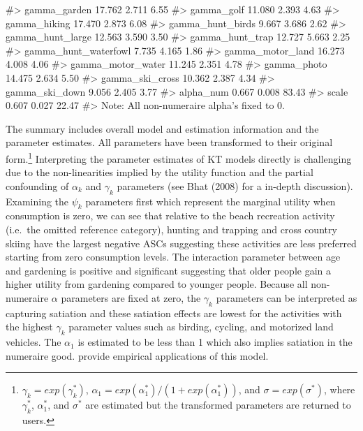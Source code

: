 \begin{Schunk}
\begin{Soutput}
#> gamma_garden           17.762   2.711   6.55
#> gamma_golf             11.080   2.393   4.63
#> gamma_hiking           17.470   2.873   6.08
#> gamma_hunt_birds        9.667   3.686   2.62
#> gamma_hunt_large       12.563   3.590   3.50
#> gamma_hunt_trap        12.727   5.663   2.25
#> gamma_hunt_waterfowl    7.735   4.165   1.86
#> gamma_motor_land       16.273   4.008   4.06
#> gamma_motor_water      11.245   2.351   4.78
#> gamma_photo            14.475   2.634   5.50
#> gamma_ski_cross        10.362   2.387   4.34
#> gamma_ski_down          9.056   2.405   3.77
#> alpha_num               0.667   0.008  83.43
#> scale                   0.607   0.027  22.47
#> Note: All non-numeraire alpha's fixed to 0.
\end{Soutput}
\end{Schunk}

The summary includes overall model and estimation information and the
parameter estimates. All parameters have been transformed to their
original form.\footnote{\(\gamma_k = exp(\gamma^*_k)\),
  \(\alpha_1 = exp(\alpha^*_1)/(1 + exp(\alpha^*_1))\), and
  \(\sigma = exp(\sigma^*)\), where \(\gamma^*_k\), \(\alpha^*_1\), and
  \(\sigma^*\) are estimated but the transformed parameters are returned
  to users.} Interpreting the parameter estimates of KT models directly
is challenging due to the non-linearities implied by the utility
function and the partial confounding of \(\alpha_k\) and \(\gamma_k\)
parameters (see Bhat (2008) for a in-depth discussion). Examining the
\(\psi_k\) parameters first which represent the marginal utility when
consumption is zero, we can see that relative to the beach recreation
activity (i.e.~the omitted reference category), hunting and trapping and
cross country skiing have the largest negative ASCs suggesting these
activities are less preferred starting from zero consumption levels. The
interaction parameter between age and gardening is positive and
significant suggesting that older people gain a higher utility from
gardening compared to younger people. Because all non-numeraire
\(\alpha\) parameters are fixed at zero, the \(\gamma_k\) parameters can
be interpreted as capturing satiation and these satiation effects are
lowest for the activities with the highest \(\gamma_k\) parameter values
such as birding, cycling, and motorized land vehicles. The \(\alpha_1\)
is estimated to be less than 1 which also implies satiation in the
numeraire good. \citet{bhatmultiple2008, lloyd-smithdecoupling2019}
provide empirical applications of this model.

